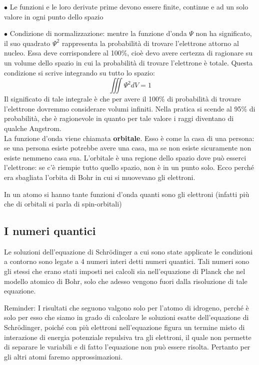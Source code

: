 $\bullet$ Le funzioni e le loro derivate prime devono essere finite, continue e ad un solo valore in ogni punto dello spazio

$\bullet$ Condizione di normalizzazione: mentre la funzione d'onda $\Psi$ non ha significato, il suo quadrato $\Psi^2$ rappresenta la probabilità di trovare l'elettrone attorno al nucleo. Essa deve corrispondere al 100\%, cioè devo avere certezza di ragionare su un volume dello spazio in cui la probabilità di trovare l'elettrone è totale. Questa condizione si scrive integrando su tutto lo spazio:
$$\iiint \Psi^2dV=1$$
Il significato di tale integrale è che per avere il 100\% di probabilità di trovare l'elettrone dovremmo considerare volumi infiniti. Nella pratica si scende al 95\% di probabilità, che è ragionevole in quanto per tale valore i raggi diventano di qualche Angstrom.\\

La funzione d'onda viene chiamata \textbf{orbitale}. Esso è come la casa di una persona: se una persona esiste potrebbe avere una casa, ma se non esiste sicuramente non esiste nemmeno casa sua. L'orbitale è una regione dello spazio dove può esserci l'elettrone: se c'è riempie tutto quello spazio, non è in un punto solo. Ecco perché era sbagliata l'orbita di Bohr in cui si muovevano gli elettroni. 

In un atomo si hanno tante funzioni d'onda quanti sono gli elettroni (infatti più che di orbitali si parla di spin-orbitali)
\subsection{I numeri quantici}
Le soluzioni dell'equazione di Schrödinger a cui sono state applicate le condizioni a contorno sono legate a 4 numeri interi detti numeri quantici. Tali numeri sono gli stessi che erano stati imposti nei calcoli sia nell'equazione di Planck che nel modello atomico di Bohr, solo che adesso vengono fuori dalla risoluzione di tale equazione.

Reminder: I risultati che seguono valgono solo per l'atomo di idrogeno, perché è solo per esso che siamo in grado di calcolare le soluzioni esatte dell'equazione di Schrödinger, poiché con più elettroni nell'equazione figura un termine misto di interazione di energia potenziale repulsiva tra gli elettroni, il quale non permette di separare le variabili e di fatto l'equazione non può essere risolta. Pertanto per gli altri atomi faremo approssimazioni.


